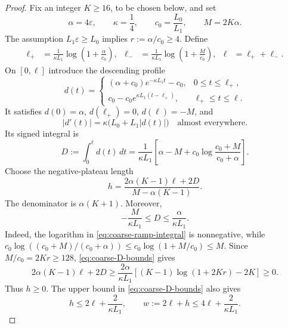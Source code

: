 \documentclass[11pt,a4paper]{article}
\newcommand{\eps}{\varepsilon}
\theoremstyle{remark}
\begin{document}
\begin{proof}
Fix an integer $K\ge16$, to be chosen below, and set
\begin{equation}
 \alpha=4\eps,
 \qquad
 \kappa=\frac14,
 \qquad
 c_0=\frac{L_0}{L_1},
 \qquad
 M=2K\alpha.
 \label{eq:coarse-pulse-scales}
\end{equation}
The assumption $L_1\eps\ge L_0$ implies
$r:=\alpha/c_0\ge4$.  Define
\begin{align}
 \ell_+
 &=\frac1{\kappa L_1}\log\left(1+\frac{\alpha}{c_0}\right),
 &
 \ell_-
 &=\frac1{\kappa L_1}\log\left(1+\frac{M}{c_0}\right),
 &
 \ell&=\ell_++\ell_- .
 \label{eq:coarse-ramp-lengths}
\end{align}
On $[0,\ell]$ introduce the descending profile
\begin{equation}
 d(t)=
 \begin{cases}
  (\alpha+c_0)e^{-\kappa L_1t}-c_0,
       &0\le t\le\ell_+,\\[1mm]
  c_0-c_0e^{\kappa L_1(t-\ell_+)},
       &\ell_+\le t\le\ell.
 \end{cases}
 \label{eq:coarse-descending-profile}
\end{equation}
It satisfies $d(0)=\alpha$, $d(\ell_+)=0$, $d(\ell)=-M$, and
\begin{equation}
 |d'(t)|=\kappa\bigl(L_0+L_1|d(t)|\bigr)
 \quad\text{almost everywhere.}
 \label{eq:coarse-ramp-ode}
\end{equation}
Its signed integral is
\begin{equation}
 D:=\int_0^\ell d(t)\,dt
 =\frac1{\kappa L_1}
 \left[
  \alpha-M+c_0\log\frac{c_0+M}{c_0+\alpha}
 \right].
 \label{eq:coarse-ramp-integral}
\end{equation}
Choose the negative-plateau length
\begin{equation}
 h=
 \frac{2\alpha(K-1)\ell+2D}
      {M-\alpha(K-1)}.
 \label{eq:coarse-plateau-length}
\end{equation}
The denominator is $\alpha(K+1)$.  Moreover,
\begin{equation}
 -\frac{M}{\kappa L_1}\le D\le\frac{\alpha}{\kappa L_1}.
 \label{eq:coarse-D-bounds}
\end{equation}
Indeed, the logarithm in \eqref{eq:coarse-ramp-integral} is nonnegative,
while
$c_0\log((c_0+M)/(c_0+\alpha))\le
c_0\log(1+M/c_0)\le M$.
Since $M/c_0=2Kr\ge128$, \eqref{eq:coarse-D-bounds} gives
\[
 2\alpha(K-1)\ell+2D
 \ge
 \frac{2\alpha}{\kappa L_1}
 \left[(K-1)\log(1+2Kr)-2K\right]
 \ge0.
\]
Thus $h\ge0$.  The upper bound in \eqref{eq:coarse-D-bounds} also gives
\begin{equation}
 h\le2\ell+\frac2{\kappa L_1},
 \qquad
 w:=2\ell+h
 \le4\ell+\frac2{\kappa L_1}.
 \label{eq:coarse-cell-width}
\end{equation}


\end{proof}
\end{document}
